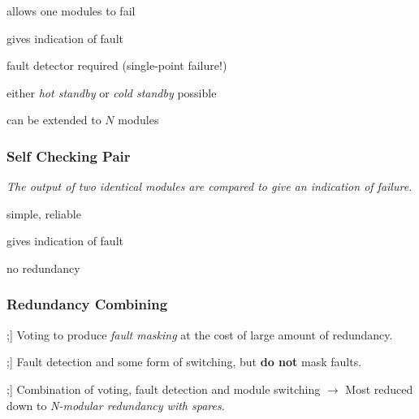 \documentclass[
  10pt,
  a4paper,
]{article}
\DeclareRobustCommand{\textHighlight}[1]{\tikz[baseline]{\node[anchor=base,fill=Gray!10, rounded corners=5pt, draw, densely dotted] {\bfseries{#1}};}}
\begin{document}
\begin{multicols*}{2}
{\small\begin{description}[parsep=0mm,labelsep=2pt,labelwidth=10pt]
  \item[\color{OliveGreen}\faPlus] allows one modules to fail
  \item[\color{OliveGreen}\faPlus] gives indication of fault
  \item[\color{BrickRed}\faMinus] fault detector required (single-point failure!)
  \item[\color{Orange}\bfseries ±] either \textit{hot standby} or \textit{cold standby} possible
  \item[\color{Orange}\bfseries ±] can be extended to $N$ modules
\end{description}}

\subsubsection{Self Checking Pair}\label{self-checking-pair}

{\small\textit{The output of two identical modules are compared to give an indication of failure.}}

\begin{center}

\end{center}

{\small\begin{description}[parsep=0mm,labelsep=2pt,labelwidth=10pt]
  \item[\color{OliveGreen}\faPlus] simple, reliable
  \item[\color{OliveGreen}\faPlus] gives indication of fault
  \item[\color{BrickRed}\faMinus] no redundancy
\end{description}}

\subsubsection{Redundancy Combining}\label{redundancy-combining}

{\small\begin{description}[style=sameline,parsep=0mm,labelsep=2pt,labelwidth=10pt]
  \item[\textHighlight{\bfseries S{\fontsize{6.5pt}{7pt}\selectfont{TATIC}}}] Voting to produce \textit{fault masking} at the cost of large amount of redundancy.
  \item[\textHighlight{\bfseries D{\fontsize{6.5pt}{7pt}\selectfont{YNAMIC}}}] Fault detection and some form of switching, but \textbf{do not} mask faults.
  \item[\textHighlight{\bfseries H{\fontsize{6.5pt}{7pt}\selectfont{YBRID}}}] Combination of voting, fault detection and module switching $\rightarrow$ Most reduced down to \textit{N-modular redundancy with spares}.
\end{description}}


\end{multicols*}
\end{document}
